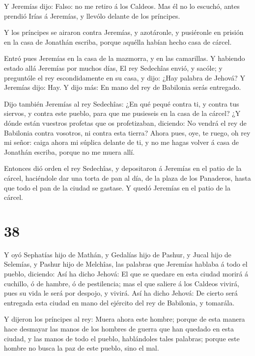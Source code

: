  Y Jeremías dijo: Falso: no me retiro á los Caldeos. Mas él
no lo escuchó, antes prendió Irías á Jeremías, y llevólo delante de los
príncipes.

 Y los príncipes se airaron contra Jeremías, y azotáronle,
y pusiéronle en prisión en la casa de Jonathán escriba, porque aquélla
habían hecho casa de cárcel.

 Entró pues Jeremías en la casa de la mazmorra, y en las
camarillas. Y habiendo estado allá Jeremías por muchos días,
 El rey Sedechîas envió, y sacóle; y preguntóle el rey
escondidamente en su casa, y dijo: ¿Hay palabra de Jehová? Y Jeremías
dijo: Hay. Y dijo más: En mano del rey de Babilonia serás entregado.

 Dijo también Jeremías al rey Sedechîas: ¿En qué pequé
contra ti, y contra tus siervos, y contra este pueblo, para que me
pusieseis en la casa de la cárcel?  ¿Y dónde están vuestros
profetas que os profetizaban, diciendo: No vendrá el rey de Babilonia
contra vosotros, ni contra esta tierra?  Ahora pues, oye,
te ruego, oh rey mi señor: caiga ahora mi súplica delante de ti, y no me
hagas volver á casa de Jonathán escriba, porque no me muera allí.

 Entonces dió orden el rey Sedechîas, y depositaron á
Jeremías en el patio de la cárcel, haciéndole dar una torta de pan al
día, de la plaza de los Panaderos, hasta que todo el pan de la ciudad se
gastase. Y quedó Jeremías en el patio de la cárcel.

\hypertarget{section-37}{%
\section{38}\label{section-37}}

 Y oyó Sephatías hijo de Mathán, y Gedalías hijo de Pashur,
y Jucal hijo de Selemías, y Pashur hijo de Melchîas, las palabras que
Jeremías hablaba á todo el pueblo, diciendo:  Así ha dicho
Jehová: El que se quedare en esta ciudad morirá á cuchillo, ó de hambre,
ó de pestilencia; mas el que saliere á los Caldeos vivirá, pues su vida
le será por despojo, y vivirá.  Así ha dicho Jehová: De
cierto será entregada esta ciudad en mano del ejército del rey de
Babilonia, y tomarála.

 Y dijeron los príncipes al rey: Muera ahora este hombre;
porque de esta manera hace desmayar las manos de los hombres de guerra
que han quedado en esta ciudad, y las manos de todo el pueblo,
hablándoles tales palabras; porque este hombre no busca la paz de este
pueblo, sino el mal.

